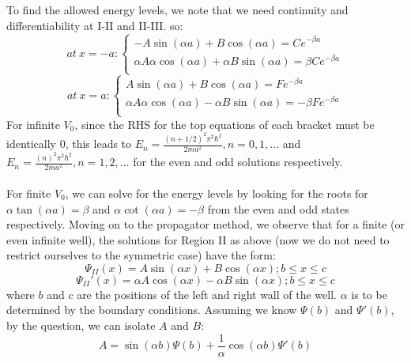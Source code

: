 \documentclass[10pt]{article} %
\begin{document}
\noindent To find the allowed energy levels, we note that we need continuity and differentiability at I-II and II-III. so:
\begin{equation}
at\ x=-a:
\begin{cases}
-A\sin (\alpha a) + B\cos (\alpha a) = Ce^{-\beta a} \\
\alpha A\alpha \cos (\alpha a) + \alpha B\sin (\alpha a) = \beta Ce^{-\beta a} \\
\end{cases}
\end{equation}
\begin{equation}
at\ x=a:
\begin{cases}
A\sin (\alpha a) + B\cos (\alpha a) = Fe^{-\beta a} \\
\alpha A\alpha \cos (\alpha a) - \alpha B\sin (\alpha a) = -\beta Fe^{-\beta a} \\
\end{cases}
\end{equation}
\noindent For infinite $V_0$, since the RHS for the top equations of each bracket must be identically 0, this leads to $E_n = \frac{(n + 1/2)^2 \pi ^2 \hbar^2}{2ma^2}, n = 0,1,\dots$ and $E_n = \frac{(n)^2 \pi ^2 \hbar^2}{2ma^2}, n = 1,2,\dots$ for the even and odd solutions respectively.
\\ \\
\noindent For finite $V_0$, we can solve for the energy levels by looking for the roots for $\alpha \tan(\alpha a) = \beta$ and $\alpha \cot(\alpha a) = -\beta$ from the even and odd states respectively.
\newpage
\noindent Moving on to the propagator method, we observe that for a finite (or even infinite well), the solutions for Region II as above (now we do not need to restrict ourselves to the symmetric case) have the form:
\begin{equation}
\Psi _{II}(x) = A\sin (\alpha x) + B\cos (\alpha x); b\leq x \leq c
\end{equation}
\begin{equation}
\Psi _{II}'(x) = \alpha A\cos (\alpha x) - \alpha  B\sin (\alpha x); b\leq x \leq c
\end{equation}
where $b$ and $c$ are the positions of the left and right wall of the well. $\alpha$ is to be determined by the boundary conditions. Assuming we know $\Psi (b)$ and $\Psi ' (b)$, by the question, we can isolate $A$ and $B$:
\begin{equation}
A = \sin(\alpha b)\Psi (b) + \frac{1}{\alpha}\cos (\alpha b) \Psi ' (b)
\end{equation}
\end{document}
